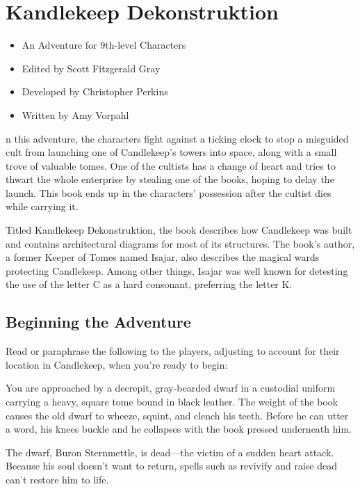 \documentclass[10pt,a4paper,twoside,bg=print,twocolumn,openany,nodeprecatedcode]{dndbook}
\begin{document}
\chapter{Kandlekeep Dekonstruktion}

\begin{itemize}
\item An Adventure for 9th-level Characters
\item Edited by Scott Fitzgerald Gray
\item Developed by Christopher Perkins
\item Written by Amy Vorpahl
\end{itemize}

n this adventure, the characters fight against a ticking clock to stop a misguided cult from launching one of Candlekeep's towers into space, along with a small trove of valuable tomes. One of the cultists has a change of heart and tries to thwart the whole enterprise by stealing one of the books, hoping to delay the launch. This book ends up in the characters' possession after the cultist dies while carrying it.


Titled Kandlekeep Dekonstruktion, the book describes how Candlekeep was built and contains architectural diagrams for most of its structures. The book's author, a former Keeper of Tomes named Isajar, also describes the magical wards protecting Candlekeep. Among other things, Isajar was well known for detesting the use of the letter C as a hard consonant, preferring the letter K.

\section{Beginning the Adventure}
Read or paraphrase the following to the players, adjusting to account for their location in Candlekeep, when you're ready to begin:

\begin{DndReadAloud}{}
You are approached by a decrepit, gray-bearded dwarf in a custodial uniform carrying a heavy, square tome bound in black leather. The weight of the book causes the old dwarf to wheeze, squint, and clench his teeth. Before he can utter a word, his knees buckle and he collapses with the book pressed underneath him.

\end{DndReadAloud}

The dwarf, Buron Sternmettle, is dead—the victim of a sudden heart attack. Because his soul doesn't want to return, spells such as revivify and raise dead can't restore him to life.
\end{document}
